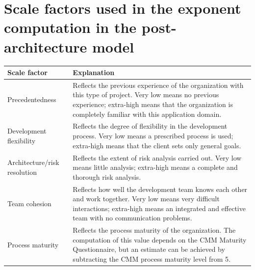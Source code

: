  \section{Scale factors used in the exponent computation in the post-architecture model}
 \begin{table}[h!]
 \centering
 \begin{tabular}{ |p{3cm}|p{8cm}|  }
 \hline
 Scale factor & Explanation\\
 \hline
 \hline
 Precedentedness & Reflects the previous experience of the organization with this type of project. Very low means no previous experience; extra-high means that the organization is completely familiar with this application domain.\\
 \hline
 Development flexibility & Reflects the degree of flexibility in the development process. Very low means a prescribed process is used; extra-high means that the client sets only general goals.\\
 \hline
 Architecture/risk resolution & Reflects the extent of risk analysis carried out. Very low means little analysis; extra-high means a complete and thorough risk analysis.\\
 \hline
 Team cohesion & Reflects how well the development team knows each other and work together. Very low means very difficult interactions; extra-high means an integrated and effective team with no communication problems.\\
 \hline
 Process maturity & Reflects the process maturity of the organization. The computation of this value depends on the CMM Maturity Questionnaire, but an estimate can be achieved by subtracting the CMM process maturity level from 5.\\
 \hline
 \end{tabular}

 \label{table:T6_4}
 \end{table}

\newpage

